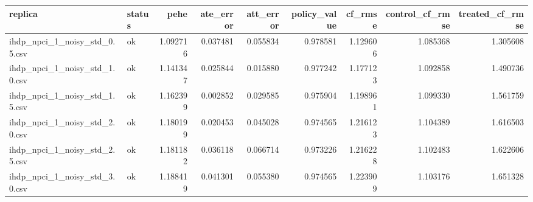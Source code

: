 \begin{tabular}{llrrrrrrr}
\toprule
replica & status & pehe & ate_error & att_error & policy_value & cf_rmse & control_cf_rmse & treated_cf_rmse \\
\midrule
ihdp_npci_1_noisy_std_0.5.csv & ok & 1.092716 & 0.037481 & 0.055834 & 0.978581 & 1.129606 & 1.085368 & 1.305608 \\
ihdp_npci_1_noisy_std_1.0.csv & ok & 1.141347 & 0.025844 & 0.015880 & 0.977242 & 1.177123 & 1.092858 & 1.490736 \\
ihdp_npci_1_noisy_std_1.5.csv & ok & 1.162399 & 0.002852 & 0.029585 & 0.975904 & 1.198961 & 1.099330 & 1.561759 \\
ihdp_npci_1_noisy_std_2.0.csv & ok & 1.180199 & 0.020453 & 0.045028 & 0.974565 & 1.216123 & 1.104389 & 1.616503 \\
ihdp_npci_1_noisy_std_2.5.csv & ok & 1.181182 & 0.036118 & 0.066714 & 0.973226 & 1.216228 & 1.102483 & 1.622606 \\
ihdp_npci_1_noisy_std_3.0.csv & ok & 1.188419 & 0.041301 & 0.055380 & 0.974565 & 1.223909 & 1.103176 & 1.651328 \\
\bottomrule
\end{tabular}
